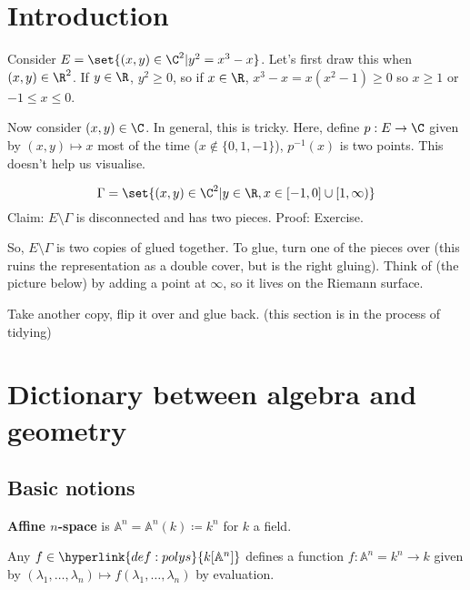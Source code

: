 \documentclass{article}
\newcommand{\A}{\mathbb{A}}
\begin{document}
\maketitle
\tableofcontents

\section*{Introduction}
\color{gray}
Consider $E = \set{(x, y) \in \C^2 | y^2 = x^3 - x}$. Let's first draw this when $(x, y) \in \R^2$.
If $y \in \R$, $y^2 \geq 0$, so if $x \in \R$, $x^3 - x = x(x^2 - 1) \geq 0$ so $x \geq 1$ or $-1 \leq x \leq 0$.


Now consider $(x, y) \in \C$. In general, this is tricky.
Here, define $p: E \to \C$ given by $(x, y) \mapsto x$ most of the time ($x \notin \{0, 1, -1\}$), $p^{-1}(x)$ is two points.
This doesn't help us visualise.

\begin{equation*}
    \Gamma = \set{(x, y) \in \C^2 | y \in \R, x \in [-1, 0] \cup [1, \infty)}
\end{equation*}
Claim: $E \setminus \Gamma$ is disconnected and has two pieces.
Proof: Exercise.

So, $E \setminus \Gamma$ is two copies of
glued together. To glue, turn one of the pieces over (this ruins the representation as a double cover, but is the right gluing).
Think of (the picture below) by adding a point at $\infty$, so it lives on the Riemann surface.

Take another copy, flip it over and glue back.
(this section is in the process of tidying)

\color{black}
\clearpage
\section{Dictionary between algebra and geometry}
\subsection{Basic notions}
\begin{defi}
    \textbf{Affine $n$-space} is $\A^n = \A^n(k) \coloneqq k^n$ for $k$ a field.
\end{defi}
Any $f \in \hyperlink{def:polys}{k[\A^n]}$ defines a function $f: \A^n =k^n \to k$ given by $(\lambda_1, \dotsc, \lambda_n) \mapsto f(\lambda_1, \dotsc, \lambda_n)$ by evaluation.
\end{document}
